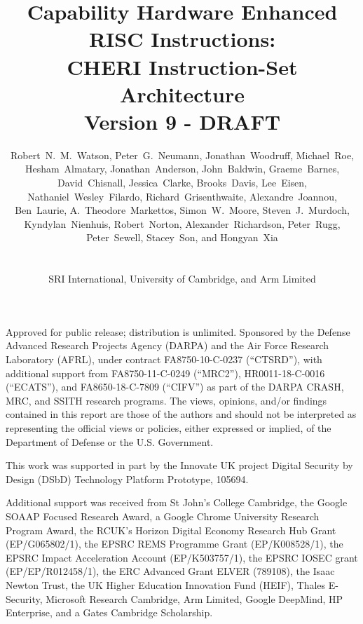 \documentclass[12pt,letterpaper,twoside,openright,fleqn]{report}
\begin{document}
\title{Capability Hardware Enhanced RISC Instructions: \\
  \smallskip CHERI Instruction-Set Architecture \\
  {\large Version 9 - DRAFT}}
\author{
  \parbox{\linewidth}{\centering%
    Robert~N.~M.~Watson,
    Peter~G.~Neumann,
    Jonathan~Woodruff,
    Michael~Roe,
    Hesham~Almatary,
    Jonathan~Anderson,
    John~Baldwin,
    Graeme~Barnes,
    David~Chisnall,
    Jessica~Clarke,
    Brooks~Davis,
    Lee~Eisen,
    Nathaniel~Wesley~Filardo,
    Richard~Grisenthwaite,
    Alexandre~Joannou,
    Ben~Laurie,
    A.~Theodore~Markettos,
    Simon~W.~Moore,
    Steven~J.~Murdoch,
    Kyndylan~Nienhuis,
    Robert~Norton,
    Alexander~Richardson,
    Peter~Rugg,
    Peter~Sewell,
    Stacey~Son, and
    Hongyan~Xia
  }%
  \\
  \\
  SRI International, University of Cambridge, and Arm Limited
}

\begin{minipage}[h]{\textwidth}
  \maketitle

  {\footnotesize
    Approved for public release; distribution is unlimited.
    Sponsored by the Defense Advanced Research Projects Agency (DARPA) and the
    Air Force Research Laboratory (AFRL), under contract FA8750-10-C-0237
    (``CTSRD''), with additional support from FA8750-11-C-0249 (``MRC2''),
    HR0011-18-C-0016 (``ECATS''), and FA8650-18-C-7809 (``CIFV'') as part of
    the DARPA CRASH, MRC, and SSITH research programs.
    The views, opinions, and/or findings contained in this report are those of
    the authors and should not be interpreted as representing the official
    views or policies, either expressed or implied, of the Department of
    Defense or the U.S. Government.

    \smallskip
    This work was supported in part by the Innovate UK project Digital
    Security by Design (DSbD) Technology Platform Prototype, 105694.

    \smallskip
    Additional support was received from St John's College Cambridge,
    the Google SOAAP Focused Research Award, a Google Chrome University
    Research Program Award, the RCUK's Horizon Digital Economy Research Hub
    Grant (EP/G065802/1), the EPSRC REMS Programme Grant (EP/K008528/1), the
    EPSRC Impact Acceleration Account (EP/K503757/1), the EPSRC IOSEC grant
    (EP/EP/R012458/1), the ERC Advanced Grant ELVER (789108), the Isaac Newton
    Trust, the UK Higher Education Innovation Fund (HEIF), Thales E-Security,
    Microsoft Research Cambridge, Arm Limited, Google DeepMind, HP Enterprise,
    and a Gates Cambridge Scholarship.

}
\end{minipage}
\end{document}
